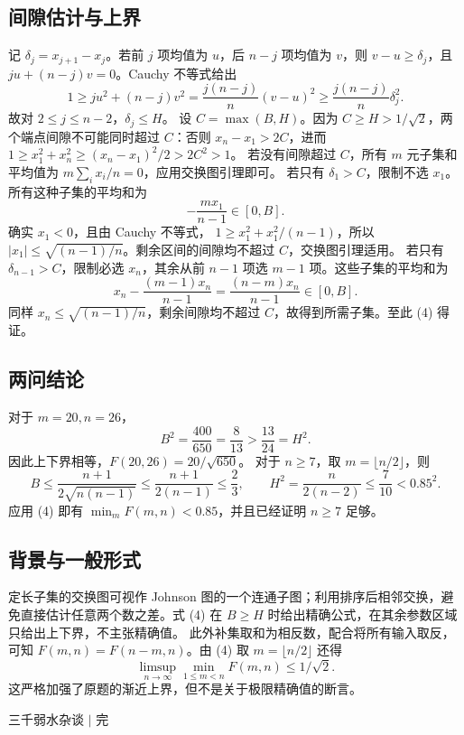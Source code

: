 \documentclass[UTF8,11pt,a4paper,fontset=fandol]{ctexart}
\begin{document}
\subsection*{间隙估计与上界}
记 $\delta_j=x_{j+1}-x_j$。若前 $j$ 项均值为 $u$，后 $n-j$ 项均值为 $v$，则 $v-u\ge\delta_j$，且 $ju+(n-j)v=0$。Cauchy 不等式给出
\[
1\ge ju^2+(n-j)v^2
=\frac{j(n-j)}n(v-u)^2
\ge\frac{j(n-j)}n\delta_j^2.
\]
故对 $2\le j\le n-2$，$\delta_j\le H$。
设 $C=\max(B,H)$。因为 $C\ge H>1/\sqrt2$，两个端点间隙不可能同时超过 $C$：否则 $x_n-x_1>2C$，进而
$1\ge x_1^2+x_n^2\ge(x_n-x_1)^2/2>2C^2>1$。
若没有间隙超过 $C$，所有 $m$ 元子集和平均值为 $m\sum_i x_i/n=0$，应用交换图引理即可。
若只有 $\delta_1>C$，限制不选 $x_1$。所有这种子集的平均和为
\[
-\frac{mx_1}{n-1}\in[0,B].
\]
确实 $x_1<0$，且由 Cauchy 不等式，
$1\ge x_1^2+x_1^2/(n-1)$，所以 $|x_1|\le\sqrt{(n-1)/n}$。剩余区间的间隙均不超过 $C$，交换图引理适用。
若只有 $\delta_{n-1}>C$，限制必选 $x_n$，其余从前 $n-1$ 项选 $m-1$ 项。这些子集的平均和为
\[
x_n-\frac{(m-1)x_n}{n-1}
=\frac{(n-m)x_n}{n-1}\in[0,B].
\]
同样 $x_n\le\sqrt{(n-1)/n}$，剩余间隙均不超过 $C$，故得到所需子集。至此 (4) 得证。
\subsection*{两问结论}
对于 $m=20,n=26$，
\[
B^2=\frac{400}{650}=\frac8{13}>\frac{13}{24}=H^2.
\]
因此上下界相等，$F(20,26)=20/\sqrt{650}$。
对于 $n\ge7$，取 $m=\lfloor n/2\rfloor$，则
\[
B\le\frac{n+1}{2\sqrt{n(n-1)}}
\le\frac{n+1}{2(n-1)}\le\frac23,
\qquad
H^2=\frac{n}{2(n-2)}\le\frac7{10}<0.85^2.
\]
应用 (4) 即有 $\min_m F(m,n)<0.85$，并且已经证明 $n\ge7$ 足够。
\subsection*{背景与一般形式}
定长子集的交换图可视作 Johnson 图的一个连通子图；利用排序后相邻交换，避免直接估计任意两个数之差。式 (4) 在 $B\ge H$ 时给出精确公式，在其余参数区域只给出上下界，不主张精确值。
此外补集取和为相反数，配合将所有输入取反，可知 $F(m,n)=F(n-m,n)$。由 (4) 取 $m=\lfloor n/2\rfloor$ 还得
\[
\limsup_{n\to\infty}\min_{1\le m<n}F(m,n)
\le 1/\sqrt2.
\]
这严格加强了原题的渐近上界，但不是关于极限精确值的断言。

\vfill
\begin{center}\small\color{accent} 三千弱水杂谈 \quad $\vert$ \quad 完\end{center}
\end{document}
